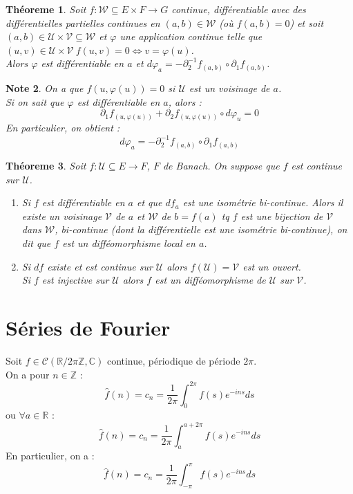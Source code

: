\documentclass[a4paper, oneside]{report}
\theoremstyle{break}
\newtheorem{thm}{Théoreme}[section] %
\newtheorem{note}[thm]{Note}
\newcommand{\x}{\times}
\newcommand{\R}{\mathbb{R}}
\newcommand{\C}{\mathbb{C}}
\newcommand{\Z}{\mathbb{Z}}
\newcommand{\fracun}[1]{\frac{1}{#1}}
\begin{document}
\begin{thm}
Soit $f:\mathcal{W}\subseteq E\x F \rightarrow G$ continue, différentiable avec des différentielles partielles continues en $(a,b) \in \mathcal{W}$ (où $f(a,b) = 0$) et soit 
$(a,b)\in \mathcal{U}\x \mathcal{V}\subseteq \mathcal{W}$ et $\varphi$ une application continue telle que $(u,v)\in \mathcal{U}\x \mathcal{V}~f(u,v)=0 \Leftrightarrow v=\varphi(u)$.\\
Alors $\varphi$ est différentiable en $a$ et $d\varphi_a=-\partial_2^{-1}f_{(a,b)}\circ \partial_1f_{(a,b)}$.
\end{thm}

\begin{note}
On a que $f(u,\varphi(u))= 0$ si $\mathcal{U}$ est un voisinage de $a$.\\
Si on sait que $\varphi$ est différentiable en $a$, alors :
$$\partial_1 f_{(u,\varphi(u))}+\partial_2 f_{(u,\varphi(u))}\circ d\varphi_u = 0$$
En particulier, on obtient :
$$d\varphi_a=-\partial_2^{-1}f_{(a,b)}\circ \partial_1f_{(a,b)}$$
\end{note}

\begin{thm}
Soit $f : \mathcal{U}\subseteq E \rightarrow F$, $F$ de Banach. On suppose que $f$ est continue sur $\mathcal{U}$.
\begin{enumerate}
\item Si $f$ est différentiable en $a$ et que $df_a$ est une isométrie bi-continue. Alors il existe un voisinage $\mathcal{V}$ de $a$ et $\mathcal{W}$ de $b=f(a)$ tq $f$ est une bijection de $\mathcal{V}$ dans $\mathcal{W}$, bi-continue (dont la différentielle est une isométrie bi-continue), on dit que $f$ est un difféomorphisme local en $a$.

\item Si $df$ existe et est continue sur $\mathcal{U}$ alors $f(\mathcal{U})=\mathcal{V}$ est un ouvert.\\
Si $f$ est injective sur $\mathcal{U}$ alors $f$ est un difféomorphisme de $\mathcal{U}$ sur $\mathcal{V}$.
\end{enumerate}
\end{thm}



\chapter{Séries de Fourier}

Soit $f\in \mathcal{C}(\R / 2\pi \Z, \C)$ continue, périodique de période $2\pi$.\\
On a pour $n\in \Z$ :
$$\widehat{f}(n)=c_n=\fracun{2\pi}\int_0^{2\pi}f(s)e^{-ins}ds$$
ou $\forall a\in \R$ :
$$\widehat{f}(n)=c_n=\fracun{2\pi}\int_a^{a+2\pi}f(s)e^{-ins}ds$$
En particulier, on a :
$$\widehat{f}(n)=c_n=\fracun{2\pi}\int_{-\pi}^{\pi}f(s)e^{-ins}ds$$
\end{document}
